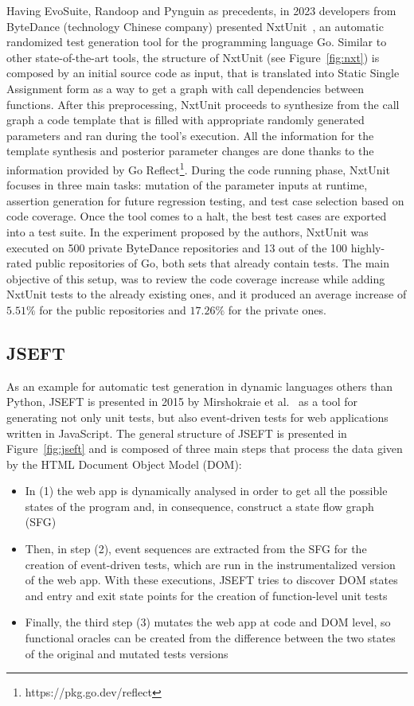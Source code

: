 \documentclass[%
  chapterprefix=false,%
  open=right,%
  twoside=true,%
  paper=a4,%
  logofile={Figures/logo.png},%
  thesistype=master,%
  UKenglish,%
]{se2thesis}
\begin{document}
Having EvoSuite, Randoop and Pynguin as precedents, in 2023 developers from ByteDance (technology Chinese company) presented NxtUnit~\cite{DBLP:conf/ease/WangMCGSP23}, an automatic randomized test generation tool for the programming language Go.
Similar to other state-of-the-art tools, the structure of NxtUnit (see Figure~\ref{fig:nxt}) is composed by an initial source code as input, that is translated into Static Single Assignment form as a way to get a graph with call dependencies between functions.
After this preprocessing, NxtUnit proceeds to synthesize from the call graph a code template that is filled with appropriate randomly generated parameters and ran during the tool's execution.
All the information for the template synthesis and posterior parameter changes are done thanks to the information provided by Go Reflect\footnote{https://pkg.go.dev/reflect}.
During the code running phase, NxtUnit focuses in three main tasks: mutation of the parameter inputs at runtime, assertion generation for future regression testing, and test case selection based on code coverage.
Once the tool comes to a halt, the best test cases are exported into a test suite.
In the experiment proposed by the authors, NxtUnit was executed on 500 private ByteDance repositories and 13 out of the 100 highly-rated public repositories of Go, both sets that already contain tests.
The main objective of this setup, was to review the code coverage increase while adding NxtUnit tests to the already existing ones, and it produced an average increase of \(5.51\%\) for the public repositories and \(17.26\%\) for the private ones.
\subsection{JSEFT}

As an example for automatic test generation in dynamic languages others than Python, JSEFT is presented in 2015 by Mirshokraie et al.~\cite{DBLP:conf/icst/Mirshokraie0P15} as a tool for generating not only unit tests, but also event-driven tests for web applications written in JavaScript.
The general structure of JSEFT is presented in Figure~\ref{fig:jseft} and is composed of three main steps that process the data given by the HTML Document Object Model (DOM):
\begin{itemize}
  \item In (1) the web app is dynamically analysed in order to get all the possible states of the program and, in consequence, construct a state flow graph (SFG)
  \item Then, in step (2), event sequences are extracted from the SFG for the creation of event-driven tests, which are run in the instrumentalized version of the web app.
  With these executions, JSEFT tries to discover DOM states and entry and exit state points for the creation of function-level unit tests
  \item Finally, the third step (3) mutates the web app at code and DOM level, so functional oracles can be created from the difference between the two states of the original and mutated tests versions
\end{itemize}
\end{document}
